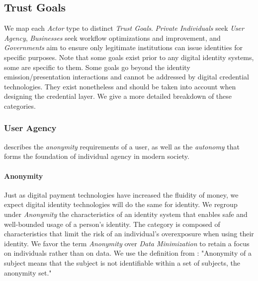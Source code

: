 \subsection{Trust Goals}
\label{subsub:trust_goals}

\vspace{1em}


We map each \emph{Actor} type to distinct \emph{Trust Goals}. \emph{Private Individuals} seek \emph{User Agency}, \emph{Businesses} seek workflow optimizations and improvement, and \emph{Governments} aim to ensure only legitimate institutions can issue identities for specific purposes.
Note that some goals exist prior to any digital identity systems, some are specific to them. Some goals go beyond the identity emission/presentation interactions and cannot be addressed by digital credential technologies. 
They exist nonetheless and should be taken into account when designing the credential layer. We give a more detailed breakdown of these categories.


\subsubsection{User Agency} describes the \emph{anonymity} requirements of a user, as well as the \emph{autonomy} that forms the foundation of individual agency in modern society.

\paragraph{Anonymity} Just as digital payment technologies have increased the fluidity of money, we expect digital identity technologies will do the same for identity. We regroup under \emph{Anonymity} the characteristics of an identity system that enables safe and well-bounded usage of a person's identity. The category is composed of characteristics that limit the risk of an individual's overexposure when using their identity. We favor the term \emph{Anonymity} over \emph{Data Minimization} to retain a focus on individuals rather than on data. We use the definition from \cite{ph10}: "Anonymity of a subject means that the subject is not identifiable within a set of
subjects, the anonymity set."

